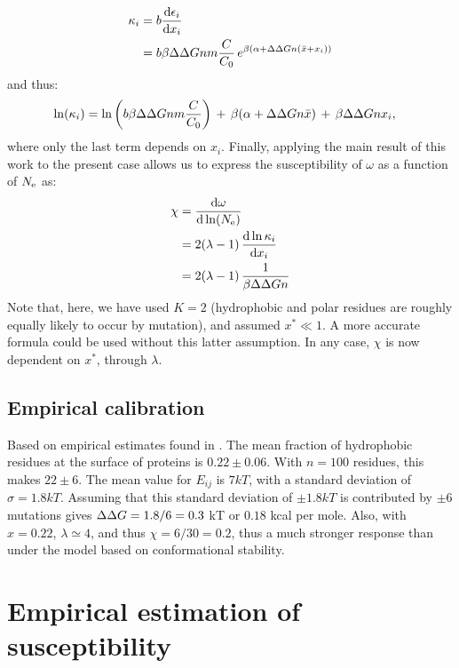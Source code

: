 \begin{align}
    \kappa_i & = b \frac{\text{d}\epsilon_i} {\text{d} x_i}
    \\ & =
    b \beta \Delta \Delta G n m \frac{C}{C_0} \, e^{\beta (\alpha +\Delta \Delta G n (\bar x + x_i))}
\end{align}
and thus:
\begin{align}
    \ln (\kappa_i) & = \ln \left( b \beta \Delta \Delta G n m \frac{C}{C_0}  \right) \, + \, \beta (\alpha +\Delta \Delta G n \bar x) \, + \, \beta \Delta \Delta Gn x_i,
\end{align}
where only the last term depends on $x_i$.
Finally, applying the main result of this work to the present case allows us to express the susceptibility of $\omega$ as a function of $N_{\text{e}}$ as:
\begin{align}
    \chi & = \frac{\text{d}\omega} {\text{d} \ln (N_{\text{e}})}
    \\ & =  2(\lambda - 1) \, \frac{\text{d}\ln \kappa_i}{\text{d} x_i}
    \\ & =  2 (\lambda - 1) \, \frac{1}{\beta \Delta \Delta G n}
\end{align}
Note that, here, we have used $K=2$ (hydrophobic and polar residues are roughly equally likely to occur by mutation), and assumed $x^* \ll 1$.
A more accurate formula could be used without this latter assumption.
In any case, $\chi$ is now dependent on $x^*$, through $\lambda$.

\subsection{Empirical calibration}
\label{subsec:empirical-calibration}

Based on empirical estimates found in \citet{Zhang2008}.
The mean fraction of hydrophobic residues at the surface of proteins is $0.22 \pm 0.06$. With $n=100$ residues, this makes $22 \pm 6$.
The mean value for $E_{ij}$ is $7kT$, with a standard deviation of $\sigma = 1.8kT$.
Assuming that this standard deviation of $\pm 1.8kT$ is contributed by $\pm 6$ mutations gives $\Delta \Delta G = 1.8 / 6 = 0.3$ kT or $0.18$ kcal per mole.
Also, with $x=0.22$, $\lambda \simeq 4$, and thus $\chi = 6 / 30 = 0.2$, thus a much stronger response than under the model based on conformational stability.


\section{Empirical estimation of susceptibility}
\label{sec:empirical-estimation-of-susceptibility}

